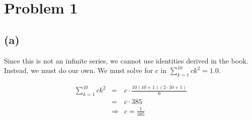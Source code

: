 \documentclass{article}
\begin{document}
\thispagestyle{fancy}

\section*{Problem 1} 

\subsection*{(a)}

Since this is not an infinite series, we cannot use identities derived in the
book. Instead, we must do our own. We must solve for $c$ in
$\displaystyle\sum\limits_{k=1}^{10} ck^2 = 1.0$.

\begin{eqnarray*}
  \sum\limits_{k=1}^{10} ck^2 &=& c \cdot \frac{10(10 + 1)(2\cdot10+1)}{6} \\
  &=& c\cdot 385 \\
  &\Rightarrow& c = \frac{1}{385}
\end{eqnarray*}
\end{document}
